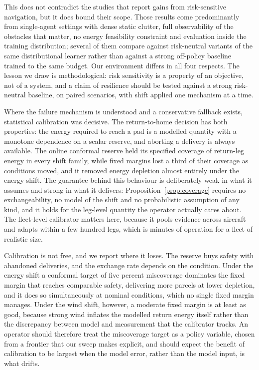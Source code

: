 This does not contradict the studies that report gains from risk-sensitive navigation, but it does bound their scope. Those results come predominantly from single-agent settings with dense static clutter, full observability of the obstacles that matter, no energy feasibility constraint and evaluation inside the training distribution; several of them compare against risk-neutral variants of the same distributional learner rather than against a strong off-policy baseline trained to the same budget. Our environment differs in all four respects. The lesson we draw is methodological: risk sensitivity is a property of an objective, not of a system, and a claim of resilience should be tested against a strong risk-neutral baseline, on paired scenarios, with shift applied one mechanism at a time.

Where the failure mechanism is understood and a conservative fallback exists, statistical calibration was decisive. The return-to-home decision has both properties: the energy required to reach a pad is a modelled quantity with a monotone dependence on a scalar reserve, and aborting a delivery is always available. The online conformal reserve held its specified coverage of return-leg energy in every shift family, while fixed margins lost a third of their coverage as conditions moved, and it removed energy depletion almost entirely under the energy shift. The guarantee behind this behaviour is deliberately weak in what it assumes and strong in what it delivers: Proposition~\ref{prop:coverage} requires no exchangeability, no model of the shift and no probabilistic assumption of any kind, and it holds for the leg-level quantity the operator actually cares about. The fleet-level calibrator matters here, because it pools evidence across aircraft and adapts within a few hundred legs, which is minutes of operation for a fleet of realistic size.

Calibration is not free, and we report where it loses. The reserve buys safety with abandoned deliveries, and the exchange rate depends on the condition. Under the energy shift a conformal target of five percent miscoverage dominates the fixed margin that reaches comparable safety, delivering more parcels at lower depletion, and it does so simultaneously at nominal conditions, which no single fixed margin manages. Under the wind shift, however, a moderate fixed margin is at least as good, because strong wind inflates the modelled return energy itself rather than the discrepancy between model and measurement that the calibrator tracks. An operator should therefore treat the miscoverage target as a policy variable, chosen from a frontier that our sweep makes explicit, and should expect the benefit of calibration to be largest when the model error, rather than the model input, is what drifts.

